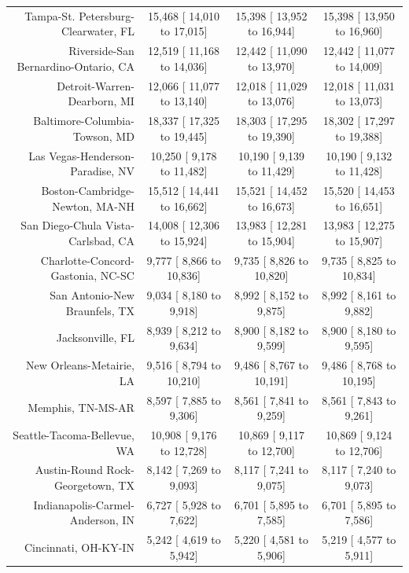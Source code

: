 \documentclass{article}
\begin{document}
\begin{table}[H]
\begin{tabular}{|r|c|c|c|}
		Tampa-St. Petersburg-Clearwater, FL &  15,468 [ 14,010 to  17,015] &  15,398 [ 13,952 to  16,944] &  15,398 [ 13,950 to  16,960]\\
		Riverside-San Bernardino-Ontario, CA &  12,519 [ 11,168 to  14,036] &  12,442 [ 11,090 to  13,970] &  12,442 [ 11,077 to  14,009]\\
		Detroit-Warren-Dearborn, MI &  12,066 [ 11,077 to  13,140] &  12,018 [ 11,029 to  13,076] &  12,018 [ 11,031 to  13,073]\\
		Baltimore-Columbia-Towson, MD &  18,337 [ 17,325 to  19,445] &  18,303 [ 17,295 to  19,390] &  18,302 [ 17,297 to  19,388]\\
		Las Vegas-Henderson-Paradise, NV &  10,250 [  9,178 to  11,482] &  10,190 [  9,139 to  11,429] &  10,190 [  9,132 to  11,428]\\
		Boston-Cambridge-Newton, MA-NH &  15,512 [ 14,441 to  16,662] &  15,521 [ 14,452 to  16,673] &  15,520 [ 14,453 to  16,651]\\
		San Diego-Chula Vista-Carlsbad, CA &  14,008 [ 12,306 to  15,924] &  13,983 [ 12,281 to  15,904] &  13,983 [ 12,275 to  15,907]\\
		Charlotte-Concord-Gastonia, NC-SC &   9,777 [  8,866 to  10,836] &   9,735 [  8,826 to  10,820] &   9,735 [  8,825 to  10,834]\\
		San Antonio-New Braunfels, TX &   9,034 [  8,180 to   9,918] &   8,992 [  8,152 to   9,875] &   8,992 [  8,161 to   9,882]\\
		Jacksonville, FL &   8,939 [  8,212 to   9,634] &   8,900 [  8,182 to   9,599] &   8,900 [  8,180 to   9,595]\\
		New Orleans-Metairie, LA &   9,516 [  8,794 to  10,210] &   9,486 [  8,767 to  10,191] &   9,486 [  8,768 to  10,195]\\
		Memphis, TN-MS-AR &   8,597 [  7,885 to   9,306] &   8,561 [  7,841 to   9,259] &   8,561 [  7,843 to   9,261]\\
		Seattle-Tacoma-Bellevue, WA &  10,908 [  9,176 to  12,728] &  10,869 [  9,117 to  12,700] &  10,869 [  9,124 to  12,706]\\
		Austin-Round Rock-Georgetown, TX &   8,142 [  7,269 to   9,093] &   8,117 [  7,241 to   9,075] &   8,117 [  7,240 to   9,073]\\
		Indianapolis-Carmel-Anderson, IN &   6,727 [  5,928 to   7,622] &   6,701 [  5,895 to   7,585] &   6,701 [  5,895 to   7,586]\\
		Cincinnati, OH-KY-IN &   5,242 [  4,619 to   5,942] &   5,220 [  4,581 to   5,906] &   5,219 [  4,577 to   5,911]\\

\end{tabular}
\end{table}
\end{document}
